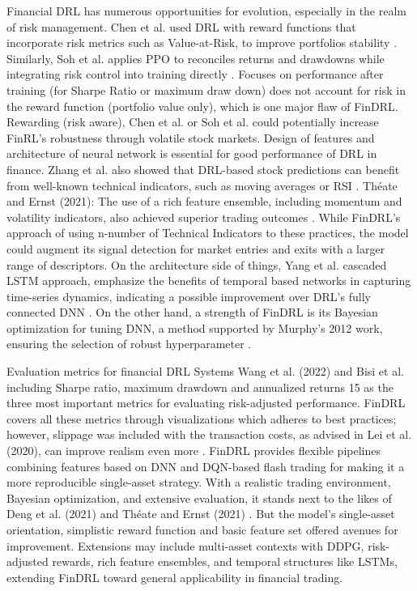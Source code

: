 Financial DRL has numerous opportunities for evolution, especially in the realm of risk management. Chen et al. used DRL with reward functions that incorporate risk metrics such as Value-at-Risk, to improve portfolios stability \cite{chen_riskaware_2021}. Similarly, Soh et al. applies PPO to reconciles returns and drawdowns while integrating risk control into training directly \cite{soh_riskcontrolled_2022}. Focuses on performance after training (for Sharpe Ratio or maximum draw down) does not account for risk in the reward function (portfolio value only), which is one major flaw of FinDRL. Rewarding (risk aware), Chen et al. or Soh et al. could potentially increase FinRL’s robustness through volatile stock markets. Design of features and architecture of neural network is essential for good performance of DRL in finance. Zhang et al. also showed that DRL-based stock predictions can benefit from well-known technical indicators, such as moving averages or RSI \cite{zhang_stockprediction_2020}. Théate and Ernst (2021): The use of a rich feature ensemble, including momentum and volatility indicators, also achieved superior trading outcomes \cite{theate_trading_2021}. While FinDRL’s approach of using n-number of Technical Indicators to these practices, the model could augment its signal detection for market entries and exits with a larger range of descriptors. On the architecture side of things, Yang et al. cascaded LSTM approach, emphasize the benefits of temporal based networks in capturing time-series dynamics, indicating a possible improvement over DRL’s fully connected DNN \cite{yang_trading_2020}. On the other hand, a strength of FinDRL is its Bayesian optimization for tuning DNN, a method supported by Murphy’s 2012 work, ensuring the selection of robust hyperparameter \cite{murphy_machinelearning_2012}.

Evaluation metrics for financial DRL Systems Wang et al. (2022) and Bisi et al. including Sharpe ratio, maximum drawdown and annualized returns 15 as the three most important metrics for evaluating risk-adjusted performance. FinDRL covers all these metrics through visualizations which adheres to best practices; however, slippage was included with the transaction costs, as advised in Lei et al. (2020), can improve realism even more \cite{wang_survey_2022}. FinDRL provides flexible pipelines combining features based on DNN and DQN-based flash trading for making it a more reproducible single-asset strategy. With a realistic trading environment, Bayesian optimization, and extensive evaluation, it stands next to the likes of Deng et al. (2021) \cite{deng_trading_2021} and Théate and Ernst (2021) \cite{theate_trading_2021}. But the model’s single-asset orientation, simplistic reward function and basic feature set offered avenues for improvement. Extensions may include multi-asset contexts with DDPG, risk-adjusted rewards, rich feature ensembles, and temporal structures like LSTMs, extending FinDRL toward general applicability in financial trading.


